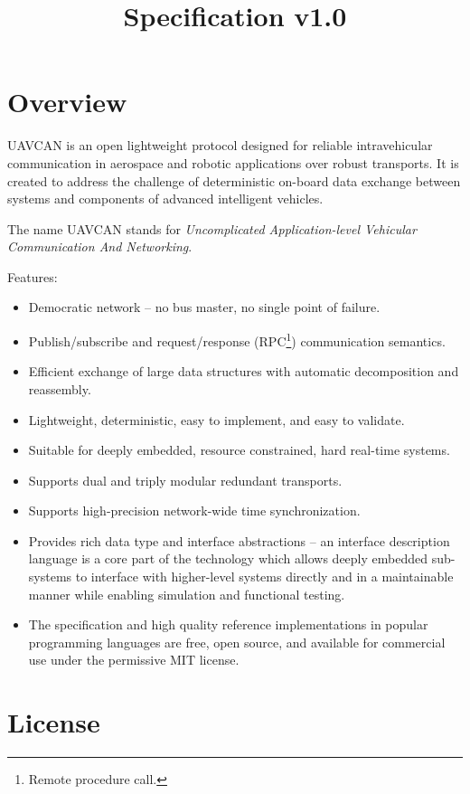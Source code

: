 \documentclass{uavcandoc}
\title{Specification v1.0}
\begin{document}
\frontmatter

\begin{titlepage}

\section*{Overview}

UAVCAN is an open lightweight protocol designed for reliable intravehicular communication
in aerospace and robotic applications over robust transports.
It is created to address the challenge of deterministic on-board data exchange
between systems and components of advanced intelligent vehicles.

The name UAVCAN stands for \emph{Uncomplicated Application-level Vehicular Communication And Networking}.

Features:

\begin{itemize}
    \item Democratic network -- no bus master, no single point of failure.
    \item Publish/subscribe and request/response (RPC\footnote{Remote procedure call.}) communication semantics.
    \item Efficient exchange of large data structures with automatic decomposition and reassembly.
    \item Lightweight, deterministic, easy to implement, and easy to validate.
    \item Suitable for deeply embedded, resource constrained, hard real-time systems.
    \item Supports dual and triply modular redundant transports.
    \item Supports high-precision network-wide time synchronization.
    \item Provides rich data type and interface abstractions -- an interface description language is a core part of
    the technology which allows deeply embedded sub-systems to interface with higher-level systems directly and
    in a maintainable manner while enabling simulation and functional testing.
    \item The specification and high quality reference implementations in popular programming languages are free,
    open source, and available for commercial use under the permissive MIT license.
\end{itemize}

\BeginRightColumn

\section*{License}


\end{titlepage}
\end{document}
